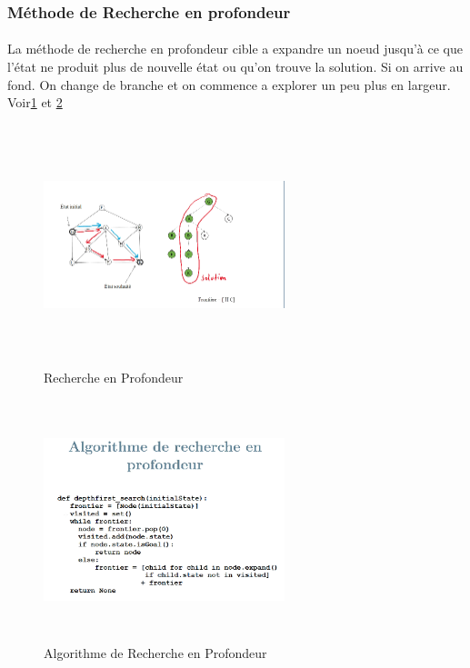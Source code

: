 \documentclass[oneside]{book}
\begin{document}
\subsubsection{Méthode de Recherche en profondeur}
\paragraph{}
La méthode de recherche en profondeur cible a expandre un noeud jusqu'à ce que l'état ne produit plus de nouvelle état ou qu'on trouve la solution. Si on arrive au fond. On change de branche et on commence a explorer un peu plus en largeur. Voir\ref{fig:Recherche_en_profondeur} et \ref{fig:Algo_Recherche_en_profondeur}

\begin{figure}[!ht]
\centering
\includegraphics[width = 7cm, height = 7cm, keepaspectratio]{Recherche_Profondeur.png}
\caption{Recherche en Profondeur}
\label{fig:Recherche_en_profondeur}
\end{figure}

\begin{figure}[!ht]
\centering
\includegraphics[width = 7cm, height = 7cm, keepaspectratio]{algo_profondeur.png}
\caption{Algorithme de Recherche en Profondeur}
\label{fig:Algo_Recherche_en_profondeur}
\end{figure}
\end{document}
